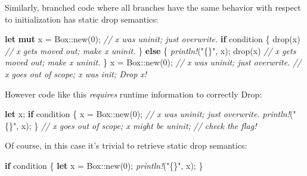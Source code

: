\documentclass[a4paper,]{book}
\newenvironment{Shaded}{\begin{snugshade}}{\end{snugshade}}
\newcommand{\KeywordTok}[1]{\textcolor[rgb]{0.13,0.29,0.53}{\textbf{{#1}}}}
\newcommand{\DataTypeTok}[1]{\textcolor[rgb]{0.13,0.29,0.53}{{#1}}}
\newcommand{\DecValTok}[1]{\textcolor[rgb]{0.00,0.00,0.81}{{#1}}}
\newcommand{\StringTok}[1]{\textcolor[rgb]{0.31,0.60,0.02}{{#1}}}
\newcommand{\CommentTok}[1]{\textcolor[rgb]{0.56,0.35,0.01}{\textit{{#1}}}}
\newcommand{\PreprocessorTok}[1]{\textcolor[rgb]{0.56,0.35,0.01}{\textit{{#1}}}}
\newcommand{\NormalTok}[1]{{#1}}
\begin{document}
Similarly, branched code where all branches have the same behavior with
respect to initialization has static drop semantics:

\begin{Shaded}
\begin{Highlighting}[]
\KeywordTok{let} \KeywordTok{mut} \NormalTok{x = }\DataTypeTok{Box}\NormalTok{::new(}\DecValTok{0}\NormalTok{);    }\CommentTok{// x was uninit; just overwrite.}
\KeywordTok{if} \NormalTok{condition \{}
    \NormalTok{drop(x)                 }\CommentTok{// x gets moved out; make x uninit.}
\NormalTok{\} }\KeywordTok{else} \NormalTok{\{}
    \PreprocessorTok{println!}\NormalTok{(}\StringTok{"\{\}"}\NormalTok{, x);}
    \NormalTok{drop(x)                 }\CommentTok{// x gets moved out; make x uninit.}
\NormalTok{\}}
\NormalTok{x = }\DataTypeTok{Box}\NormalTok{::new(}\DecValTok{0}\NormalTok{);            }\CommentTok{// x was uninit; just overwrite.}
                            \CommentTok{// x goes out of scope; x was init; Drop x!}
\end{Highlighting}
\end{Shaded}

However code like this \emph{requires} runtime information to correctly
Drop:

\begin{Shaded}
\begin{Highlighting}[]
\KeywordTok{let} \NormalTok{x;}
\KeywordTok{if} \NormalTok{condition \{}
    \NormalTok{x = }\DataTypeTok{Box}\NormalTok{::new(}\DecValTok{0}\NormalTok{);        }\CommentTok{// x was uninit; just overwrite.}
    \PreprocessorTok{println!}\NormalTok{(}\StringTok{"\{\}"}\NormalTok{, x);}
\NormalTok{\}}
                            \CommentTok{// x goes out of scope; x might be uninit;}
                            \CommentTok{// check the flag!}
\end{Highlighting}
\end{Shaded}

Of course, in this case it's trivial to retrieve static drop semantics:

\begin{Shaded}
\begin{Highlighting}[]
\KeywordTok{if} \NormalTok{condition \{}
    \KeywordTok{let} \NormalTok{x = }\DataTypeTok{Box}\NormalTok{::new(}\DecValTok{0}\NormalTok{);}
    \PreprocessorTok{println!}\NormalTok{(}\StringTok{"\{\}"}\NormalTok{, x);}
\NormalTok{\}}
\end{Highlighting}
\end{Shaded}
\end{document}
